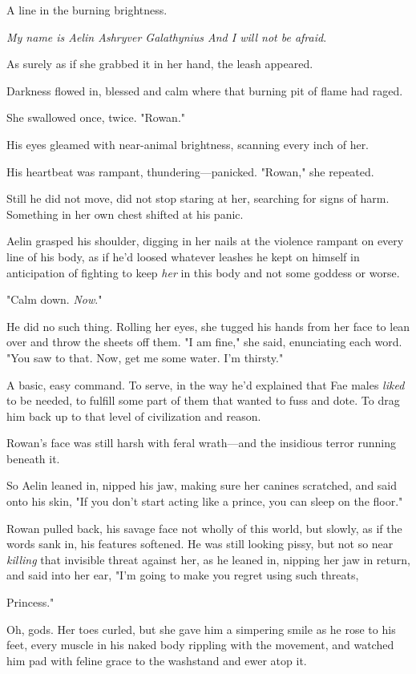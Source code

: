 A line in the burning brightness.

\emph{My name is Aelin Ashryver Galathynius  And I will not be afraid}.

As surely as if she grabbed it in her hand, the leash appeared.

Darkness flowed in, blessed and calm where that burning pit of flame had raged.

She swallowed once, twice. "Rowan."

His eyes gleamed with near-animal brightness, scanning every inch of her.

His heartbeat was rampant, thundering---panicked. "Rowan," she repeated.

Still he did not move, did not stop staring at her, searching for signs of harm. Something in her own chest shifted at his panic.

Aelin grasped his shoulder, digging in her nails at the violence rampant on every line of his body, as if he'd loosed whatever leashes he kept on himself in anticipation of fighting to keep \emph{her} in this body and not some goddess or worse.

"Calm down. \emph{Now}."

He did no such thing. Rolling her eyes, she tugged his hands from her face to lean over and throw the sheets off them. "I am fine," she said, enunciating each word. "You saw to that. Now, get me some water. I'm thirsty."

A basic, easy command. To serve, in the way he'd explained that Fae males \emph{liked} to be needed, to fulfill some part of them that wanted to fuss and dote. To drag him back up to that level of civilization and reason.

Rowan's face was still harsh with feral wrath---and the insidious terror running beneath it.

So Aelin leaned in, nipped his jaw, making sure her canines scratched, and said onto his skin, "If you don't start acting like a prince, you can sleep on the floor."

Rowan pulled back, his savage face not wholly of this world, but slowly, as if the words sank in, his features softened. He was still looking pissy, but not so near \emph{killing} that invisible threat against her, as he leaned in, nipping her jaw in return, and said into her ear, "I'm going to make you regret using such threats,

Princess."

Oh, gods. Her toes curled, but she gave him a simpering smile as he rose to his feet, every muscle in his naked body rippling with the movement, and watched him pad with feline grace to the washstand and ewer atop it.

